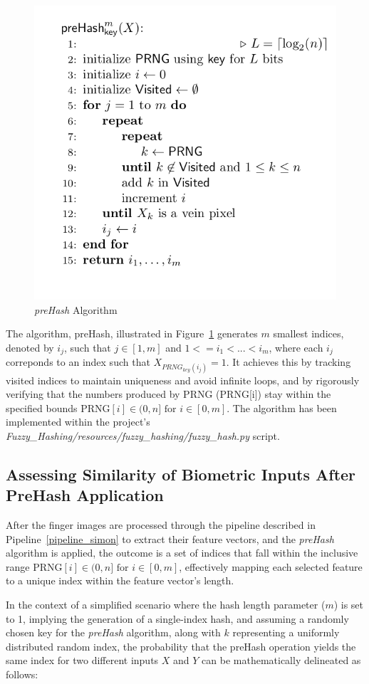 \begin{figure}[H]
    \centering
    \includegraphics[width=0.5\linewidth]{latex-img/pseudocode_preHash.png}
    \caption{\textit{preHash} Algorithm}
    \label{preHash Algorithm}
\end{figure}

The algorithm, preHash, illustrated in Figure~\ref{preHash Algorithm} generates \(m\) smallest indices, denoted by \(i_j\), such that \(j\in{[1, m]} \) and \(1 <= i_1 < ... < i_m\), where each \(i_j\) correponds to an index such that \(X_{PRNG_{key}(i_j)} = 1\). It achieves this by tracking visited indices to maintain uniqueness and avoid infinite loops, and by rigorously verifying that the numbers produced by PRNG (PRNG[i]) stay within the specified bounds \(\text{PRNG}[i] \in (0, n] \text{ for } i \in [0, m]\). The algorithm has been implemented within the project's \textit{Fuzzy\_Hashing/resources/fuzzy\_hashing/fuzzy\_hash.py} script. 

\subsection{Assessing Similarity of Biometric Inputs After PreHash Application}

After the finger images are processed through the pipeline described in Pipeline~\ref{pipeline_simon} to extract their feature vectors, and the \textit{preHash} algorithm is applied, the outcome is a set of indices that fall within the inclusive range \(\text{PRNG}[i] \in (0, n] \text{ for } i \in [0, m]\), effectively mapping each selected feature to a unique index within the feature vector's length.

In the context of a simplified scenario where the hash length parameter (\(m\)) is set to 1, implying the generation of a single-index hash, and assuming a randomly chosen key for the \textit{preHash} algorithm, along with \(k\) representing a uniformly distributed random index, the probability that the preHash operation yields the same index for two different inputs \(X\) and \(Y\) can be mathematically delineated as follows:

